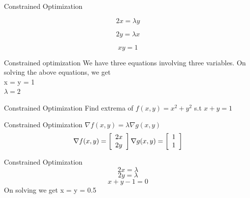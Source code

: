 \documentclass{beamer}
\begin{document}
\begin{frame}{Constrained Optimization}

\begin{equation}
2x = \lambda y
\end{equation}


\begin{equation}
2y = \lambda x
\end{equation}


\begin{equation}
xy = 1
\end{equation}


\end{frame}

\begin{frame}{Constrained optimization}
We have three equations involving three variables. 
On solving the above equations, we get\\
x = y = 1\\
$\lambda = 2$\\
\end{frame}

\begin{frame}{Constrained Optimization}
Find extrema of $f(x,y) = x^{2} + y^{2}$ s.t $x + y = 1$\\

\end{frame}

\begin{frame}{Constrained Optimization}
$\nabla f(x,y) = \lambda \nabla g(x,y)$ \\
\vspace{1em}
$$
\nabla f(x, y)=\left[\begin{array}{l}
{2 x} \\
{2 y}
\end{array}\right] 
\vspace{1em} 
\nabla g(x, y)=\left[\begin{array}{l}
{1} \\
{1}
\end{array}\right]
$$
\end{frame}

\begin{frame}{Constrained Optimization}
\begin{equation}
2x=\lambda
\end{equation}
\begin{equation}
2y=\lambda
\end{equation}
\begin{equation}
x + y - 1 = 0
\end{equation}
On solving we get x = y = 0.5
\end{frame}
\end{document}
